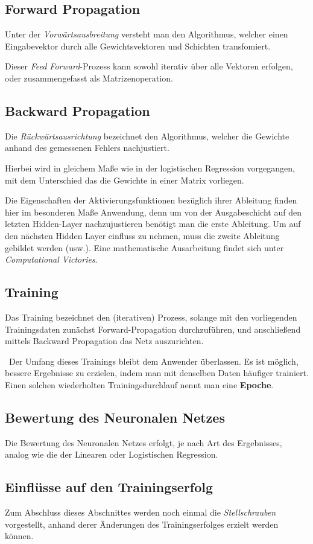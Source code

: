 \subsection{Forward Propagation}
Unter der \textit{Vorwärtsausbreitung} versteht man den Algorithmus, welcher einen Eingabevektor durch alle Gewichtsvektoren und Schichten transfomiert. 

Dieser \textit{Feed Forward}-Prozess kann sowohl iterativ über alle Vektoren erfolgen, oder zusammengefasst als Matrizenoperation.
\subsection{Backward Propagation}
Die \textit{Rückwärtsausrichtung} bezeichnet den Algorithmus, welcher die Gewichte anhand des gemessenen Fehlers nachjustiert. 

Hierbei wird in gleichem Maße wie in der logistischen Regression vorgegangen, mit dem Unterschied das die Gewichte in einer Matrix vorliegen. 

Die Eigenschaften der Aktivierungsfunktionen bezüglich ihrer Ableitung finden hier im besonderen Maße Anwendung, denn um von der Ausgabeschicht auf den letzten Hidden-Layer nachzujustieren benötigt man die erste Ableitung. Um auf den nächsten Hidden Layer einfluss zu nehmen, muss die zweite Ableitung gebildet werden (usw.). Eine mathematische Ausarbeitung findet sich unter \cite{colah} \textit{Computational Victories}.
\subsection{Training}
Das Training bezeichnet den (iterativen) Prozess, solange mit den vorliegenden Trainingsdaten zunächst Forward-Propagation durchzuführen, und anschließend mittels Backward Propagation das Netz auszurichten. 

~\newline Der Umfang dieses Trainings bleibt dem Anwender überlassen. Es ist möglich, bessere Ergebnisse zu erzielen, indem man mit denselben Daten häufiger trainiert. Einen solchen wiederholten Trainingsdurchlauf nennt man eine \textbf{Epoche}. 
\subsection{Bewertung des Neuronalen Netzes}
Die Bewertung des Neuronalen Netzes erfolgt, je nach Art des Ergebnisses, analog wie die der Linearen oder Logistischen Regression. 
\subsection{Einflüsse auf den Trainingserfolg}
Zum Abschluss dieses Abschnittes werden noch einmal die \textit{Stellschrauben} vorgestellt, anhand derer Änderungen des Trainingserfolges erzielt werden können. 

